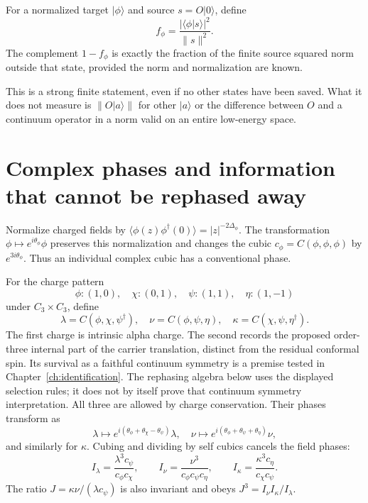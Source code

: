 \begin{definition}
For a normalized target $|\phi\rangle$ and source $s=O|0\rangle$, define
\[
 f_\phi=\frac{|\langle\phi|s\rangle|^2}{\|s\|^2}.
\]
The complement $1-f_\phi$ is exactly the fraction of the finite source
squared norm outside that state, provided the norm and normalization are known.
\end{definition}

This is a strong finite statement, even if no other states have been
saved. What it does not measure is $\|O|a\rangle\|$ for other $|a\rangle$
or the difference between $O$ and a continuum operator in a norm valid on
an entire low-energy space.

\section{Complex phases and information that cannot be rephased away}

Normalize charged fields by
$\langle\phi(z)\phi^\dagger(0)\rangle=|z|^{-2\Delta_\phi}$.
The transformation $\phi\mapsto e^{i\theta_\phi}\phi$ preserves this
normalization and changes the cubic $c_\phi=C(\phi,\phi,\phi)$ by
$e^{3i\theta_\phi}$. Thus an individual complex cubic has a conventional
phase.

For the charge pattern
\[
 \phi:(1,0),\quad\chi:(0,1),\quad
 \psi:(1,1),\quad\eta:(1,-1)
\]
under $C_3\times C_3$, define
\[
 \lambda=C(\phi,\chi,\psi^\dagger),\quad
 \nu=C(\phi,\psi,\eta),\quad
 \kappa=C(\chi,\psi,\eta^\dagger).
\]
The first charge is intrinsic alpha charge. The second records the
proposed order-three internal part of the carrier translation,
distinct from the residual conformal spin. Its survival as a faithful
continuum symmetry is a premise tested in Chapter~\ref{ch:identification}.
The rephasing algebra below uses the displayed selection rules; it
does not by itself prove that continuum symmetry interpretation.
All three are allowed by charge conservation. Their phases transform as
\[
 \lambda\mapsto e^{i(\theta_\phi+\theta_\chi-\theta_\psi)}\lambda,
 \quad
 \nu\mapsto e^{i(\theta_\phi+\theta_\psi+\theta_\eta)}\nu,
\]
and similarly for $\kappa$. Cubing and dividing by self cubics cancels
the field phases:
\begin{equation}
 I_\lambda=\frac{\lambda^3c_\psi}{c_\phi c_\chi},\qquad
 I_\nu=\frac{\nu^3}{c_\phi c_\psi c_\eta},\qquad
 I_\kappa=\frac{\kappa^3c_\eta}{c_\chi c_\psi}.
 \label{eq:triangle-invariants}
\end{equation}
The ratio $J=\kappa\nu/(\lambda c_\psi)$ is also invariant and obeys
$J^3=I_\nu I_\kappa/I_\lambda$.

